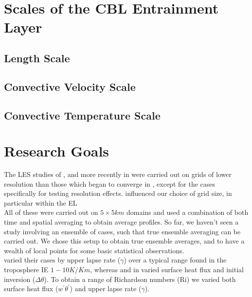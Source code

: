 \section{Scales of the CBL Entrainment Layer}
\label{sec:}

\subsection{Length Scale}
\label{subsec:}


\subsection{Convective Velocity Scale}
\label{subsec:}

\subsection{Convective Temperature Scale}
\label{}

\section{Research Goals}
\label{sec:ResearchGoals}

The LES studies of \citeauthor{SullMoengStev} \cite{SullMoengStev}, \citeauthor{FedConzMir04} \cite{FedConzMir04} and more recently \citeauthor{BrooksFowler2} in \cite{BrooksFowler2} were carried out on grids of lower resolution than those which began to converge in \citeauthor{SullPat} \cite{SullPat}, except for the cases specifically for testing resolution effects. \citeauthor{SullPat} \cite{SullPat} influenced our choice of grid size, in particular within the \acs{EL}\\

 All of these were carried out on $5 \times 5 km$ domains and used a combination of both time and spatial averaging to obtain average profiles.  So far, we haven't seen a study involving an ensemble of cases, such that true ensemble averaging can be carried out.  We chose this setup to obtain true ensemble averages, and to have a wealth of local points for some basic statistical observations.\\

\citeauthor{FedConzMir04} \cite{FedConzMir04} varied their cases by upper lapse rate ($\gamma$) over a typical range found in the troposphere IE $1 - 10 K / Km$, whereas \citeauthor{SullMoengStev} \cite{SullMoengStev} and \citeauthor{BrooksFowler2} in \cite{BrooksFowler2} varied surface heat flux and initial inversion ($\Delta \theta$).  To obtain a range of Richardson numbers (\acs{Ri}) we varied both surface heat flux ($w^{'}\theta^{'}$) and upper lapse rate ($\gamma$).\\

